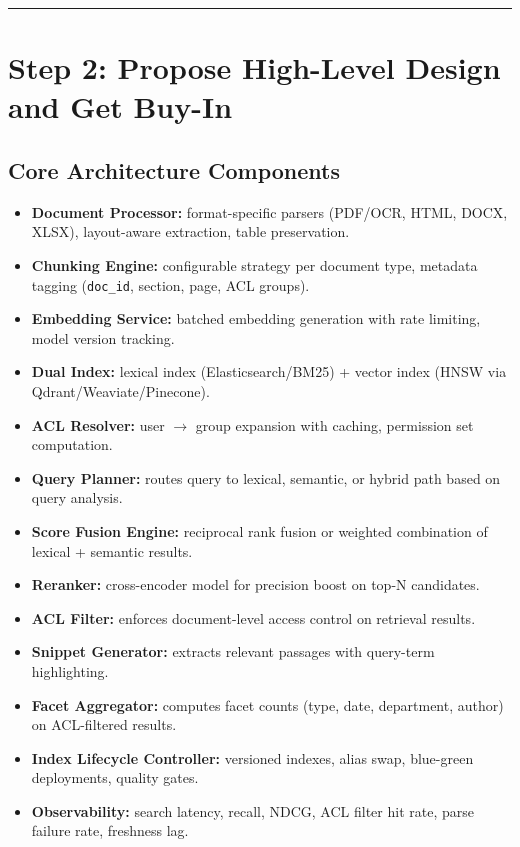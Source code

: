 \bigskip\hrule\bigskip

\section*{Step 2: Propose High-Level Design and Get Buy-In}

\subsection*{Core Architecture Components}

\begin{itemize}
  \item \textbf{Document Processor:} format-specific parsers (PDF/OCR, HTML, DOCX, XLSX), layout-aware extraction, table preservation.
  \item \textbf{Chunking Engine:} configurable strategy per document type, metadata tagging (\texttt{doc\_id}, section, page, ACL groups).
  \item \textbf{Embedding Service:} batched embedding generation with rate limiting, model version tracking.
  \item \textbf{Dual Index:} lexical index (Elasticsearch/BM25) + vector index (HNSW via Qdrant/Weaviate/Pinecone).
  \item \textbf{ACL Resolver:} user $\rightarrow$ group expansion with caching, permission set computation.
  \item \textbf{Query Planner:} routes query to lexical, semantic, or hybrid path based on query analysis.
  \item \textbf{Score Fusion Engine:} reciprocal rank fusion or weighted combination of lexical + semantic results.
  \item \textbf{Reranker:} cross-encoder model for precision boost on top-N candidates.
  \item \textbf{ACL Filter:} enforces document-level access control on retrieval results.
  \item \textbf{Snippet Generator:} extracts relevant passages with query-term highlighting.
  \item \textbf{Facet Aggregator:} computes facet counts (type, date, department, author) on ACL-filtered results.
  \item \textbf{Index Lifecycle Controller:} versioned indexes, alias swap, blue-green deployments, quality gates.
  \item \textbf{Observability:} search latency, recall, NDCG, ACL filter hit rate, parse failure rate, freshness lag.
\end{itemize}


